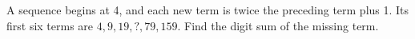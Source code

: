 A sequence begins at 4, and each new term is twice the preceding term plus 1. Its first six terms are $4,9,19,?,79,159$. Find the digit sum of the missing term.

